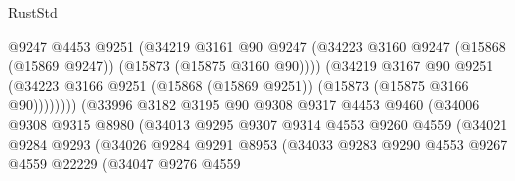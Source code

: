 \begin{lexlean}{RustStd}
\begin{coremodule}
                                      @9247
                                      @4453
                                      @9251
                                      (@34219
                                        @3161
                                        @90
                                        @9247
                                        (@34223
                                          @3160
                                          @9247
                                          (@15868 (@15869 @9247))
                                          (@15873 (@15875 @3160 @90))))
                                      (@34219
                                        @3167
                                        @90
                                        @9251
                                        (@34223
                                          @3166
                                          @9251
                                          (@15868 (@15869 @9251))
                                          (@15873 (@15875 @3166 @90))))))))
                              (@33996
                                @3182
                                @3195
                                @90
                                @9308
                                @9317
                                @4453
                                @9460
                                (@34006
                                  @9308
                                  @9315
                                  @8980
                                  (@34013
                                    @9295
                                    @9307
                                    @9314
                                    @4553
                                    @9260
                                    @4559
                                    (@34021
                                      @9284
                                      @9293
                                      (@34026
                                        @9284
                                        @9291
                                        @8953
                                        (@34033
                                          @9283
                                          @9290
                                          @4553
                                          @9267
                                          @4559
                                          @22229
                                          (@34047
                                            @9276
                                            @4559

\end{coremodule}
\end{lexlean}
